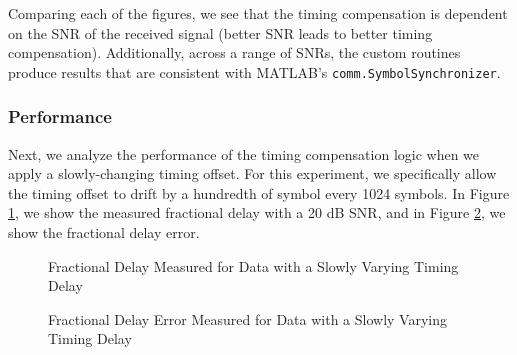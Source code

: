 \documentclass{article}
\begin{document}
\noindent Comparing each of the figures, we see that the timing compensation is dependent on the SNR of the received signal (better SNR leads to better timing compensation). Additionally, across a range of SNRs, the custom routines produce results that are consistent with MATLAB's \texttt{comm.SymbolSynchronizer}.

\subsubsection{Performance}

Next, we analyze the performance of the timing compensation logic when we apply a slowly-changing timing offset. For this experiment, we specifically allow the timing offset to drift by a hundredth of symbol every 1024 symbols. In Figure \ref{fig::fractional_delay_timing_offset}, we show the measured fractional delay with a 20 dB SNR, and in Figure \ref{fig::fractional_delay_error_timing_offset}, we show the fractional delay error.

\begin{figure}[H]
	\centerline{}
	\caption{Fractional Delay Measured for Data with a Slowly Varying Timing Delay}
	\label{fig::fractional_delay_timing_offset}
\end{figure}

\begin{figure}[H]
	\centerline{}
	\caption{Fractional Delay Error Measured for Data with a Slowly Varying Timing Delay}
	\label{fig::fractional_delay_error_timing_offset}
\end{figure}
\end{document}
